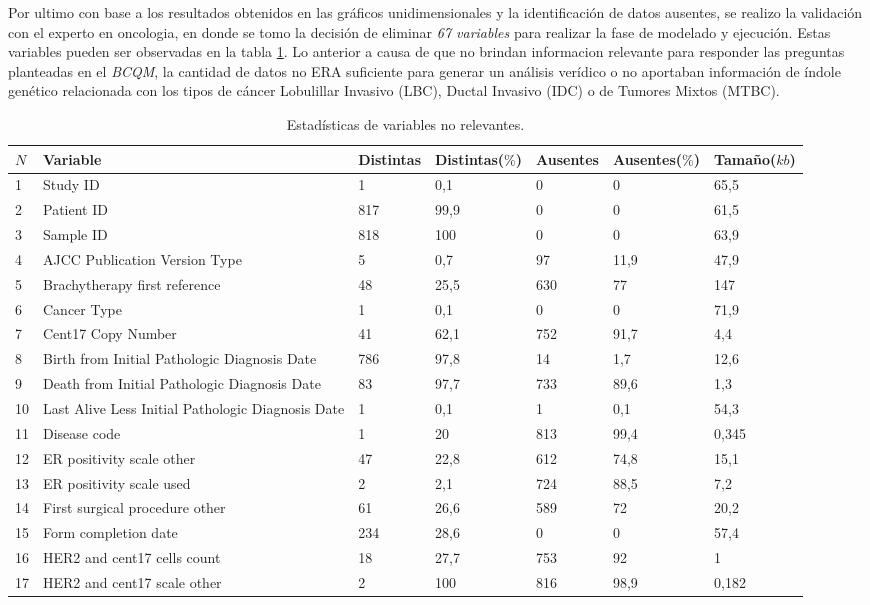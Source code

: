 Por ultimo con base a los resultados obtenidos en las gráficos unidimensionales  y  la identificación de datos ausentes, se realizo la validación con el experto en oncologia, en donde se tomo la decisión de eliminar \textit{67 variables} para realizar la fase de modelado y ejecución. Estas variables pueden ser observadas en la tabla \ref{data_no_relevante}. Lo anterior a causa de que no brindan informacion relevante para responder las preguntas planteadas en el \textit{BCQM}, la cantidad de datos no ERA suficiente para generar un análisis verídico o  no aportaban información de índole genético relacionada con los tipos de cáncer Lobulillar Invasivo (LBC), Ductal Invasivo (IDC) o de Tumores Mixtos (MTBC).

\begin{table}[!htb]
	\footnotesize
	\centering
	\begin{threeparttable}
		\caption{Estadísticas de variables no relevantes.}
		\label{data_no_relevante}
		\begin{tabular}{p{0.5cm} p{4cm} p{1.5cm} p{2cm} p{1.5cm} p{2cm} p{1.5cm}} \toprule
			$N$  &Variable &Distintas &Distintas($\%$) &Ausentes &Ausentes($\%$)  &Tamaño($kb$)
			\\ \hline	1	&	Study ID	&	1	&	0,1	&	0	&	0	&	65,5
			\\ \hline	2	&	Patient ID	&	817	&	99,9	&	0	&	0	&	61,5
			\\ \hline	3	&	Sample ID	&	818	&	100	&	0	&	0	&	63,9
			\\ \hline	4	&	AJCC Publication Version Type	&	5	&	0,7	&	97	&	11,9	&	47,9
			\\ \hline	5	&	Brachytherapy first reference	&	48	&	25,5	&	630	&	77	&	147
			\\ \hline	6	&	Cancer Type	&	1	&	0,1	&	0	&	0	&	71,9
			\\ \hline	7	&	Cent17 Copy Number	&	41	&	62,1	&	752	&	91,7	&	4,4
			\\ \hline	8	&	Birth from Initial Pathologic Diagnosis Date	&	786	&	97,8	&	14	&	1,7	&	12,6
			\\ \hline	9	&	Death from Initial Pathologic Diagnosis Date	&	83	&	97,7	&	733	&	89,6	&	1,3
			\\ \hline	10	&	Last Alive Less Initial Pathologic Diagnosis Date	&	1	&	0,1	&	1	&	0,1	&	54,3
			\\ \hline	11	&	Disease code	&	1	&	20	&	813	&	99,4	&	0,345
			\\ \hline	12	&	ER positivity scale other	&	47	&	22,8	&	612	&	74,8	&	15,1
			\\ \hline	13	&	ER positivity scale used	&	2	&	2,1	&	724	&	88,5	&	7,2
			\\ \hline	14	&	First surgical procedure other	&	61	&	26,6	&	589	&	72	&	20,2
			\\ \hline	15	&	Form completion date	&	234	&	28,6	&	0	&	0	&	57,4
			\\ \hline	16	&	HER2 and cent17 cells count	&	18	&	27,7	&	753	&	92	&	1
			\\ \hline	17	&	HER2 and cent17 scale other	&	2	&	100	&	816	&	98,9	&	0,182
			\\ \hline
		\end{tabular}
	\end{threeparttable}
\end{table}
